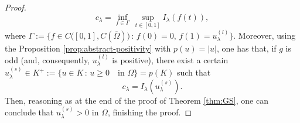 \documentclass[11pt,reqno]{amsart}
\theoremstyle{plain}
\theoremstyle{definition}
\numberwithin{equation}{section}
\newcommand{\N}{\mathbb{N}}
\begin{document}
\begin{proof}
    $$c_\lambda = \inf_{f\in \Gamma} \,\sup_{t \in [0,1]} I_\lambda(f(t)),$$
    where $\Gamma := \{ f \in C\big ([0,1], C(\overline{\Omega}) \big ) \, : \, f(0) =0, \, f(1) = u_\lambda^{(l)} \}.$
    Moreover, using the Proposition \ref{prop:abstract-positivity} with $p(u) = |u|$, one has that, if $g$ is odd (and, consequently, $u_\lambda^{(l)}$ is positive), there exist a certain $u_\lambda^{(s)} \in K^+ := \{ u \in K \, : \, u \geq 0 \quad \text{in } \Omega \} = p(K)$ such that 
    $$c_\lambda = I_\lambda(u_\lambda^{(s)}).$$ Then, reasoning as at the end of the proof of Theorem \ref{thm:GS}, one can conclude that $u_\lambda^{(s)} > 0$ in $\Omega$, finishing the proof.

    
    
\end{proof}
\end{document}
